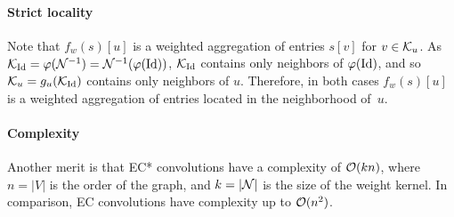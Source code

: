\paragraph{Strict locality}
Note that $f_w(s)[u]$ is a weighted aggregation of entries $s[v]$ for $v \in \mathcal{K}_u$. As $\mathcal{K}_{\operatorname{Id}} = \varphi(\mathcal{N}^{-1}) = \mathcal{N}^{-1}(\varphi(\operatorname{Id}))$, $\mathcal{K}_{\operatorname{Id}}$ contains only neighbors of $\varphi(\operatorname{Id})$, and so $\mathcal{K}_u = g_u(\mathcal{K}_{\operatorname{Id}})$ contains only neighbors of $u$. Therefore, in both cases $f_w(s)[u]$ is a weighted aggregation of entries located in the neighborhood of~$u$.

\paragraph{Complexity}
Another merit is that EC* convolutions have a complexity of $\mathcal{O}(kn)$, where $n = |V|$ is the order of the graph, and $k = |\mathcal{N}|$ is the size of the weight kernel. In comparison, EC convolutions have complexity up to $\mathcal{O}(n^2)$.





